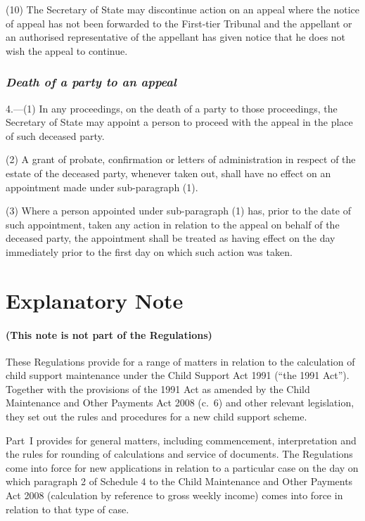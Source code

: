 \documentclass[12pt,a4paper]{article}
\begin{document}
(10) The Secretary of State may discontinue action on an appeal where the notice of appeal has not been forwarded to the First-tier Tribunal and the appellant or an authorised representative of the appellant has given notice that he does not wish the appeal to continue.

\section*{\itshape Death of a party to an appeal}

4.---(1)  In any proceedings, on the death of a party to those proceedings, the Secretary of State may appoint a person to proceed with the appeal in the place of such deceased party.

(2) A grant of probate, confirmation or letters of administration in respect of the estate of the deceased party, whenever taken out, shall have no effect on an appointment made under sub-paragraph (1).

(3) Where a person appointed under sub-paragraph (1) has, prior to the date of such appointment, taken any action in relation to the appeal on behalf of the deceased party, the appointment shall be treated as having effect on the day immediately prior to the first day on which such action was taken. 

\part{Explanatory Note}

\renewcommand\parthead{— Explanatory Note}

\subsection*{(This note is not part of the Regulations)}

These Regulations provide for a range of matters in relation to the calculation of child support maintenance under the Child Support Act 1991 (“the 1991 Act”). Together with the provisions of the 1991 Act as amended by the Child Maintenance and Other Payments Act 2008 (c.~6) and other relevant legislation, they set out the rules and procedures for a new child support scheme.

Part~I provides for general matters, including commencement, interpretation and the rules for rounding of calculations and service of documents. The Regulations come into force for new applications in relation to a particular case on the day on which paragraph 2 of Schedule 4 to the Child Maintenance and Other Payments Act 2008 (calculation by reference to gross weekly income) comes into force in relation to that type of case.
\end{document}
